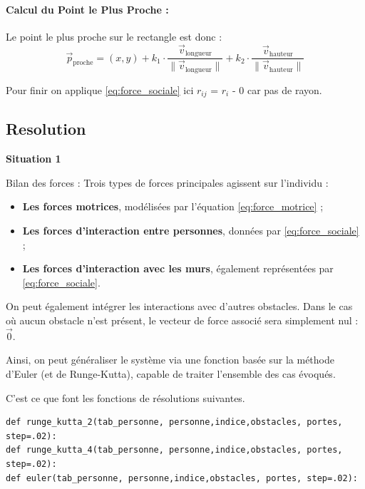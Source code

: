 \documentclass[a4paper,12pt]{article}
\begin{document}
\paragraph{Calcul du Point le Plus Proche :}

Le point le plus proche sur le rectangle est donc :
\[
\vec{p}_{\text{proche}} = (x, y) + k_1 \cdot \frac{\vec{v}_{\text{longueur}}}{\|\vec{v}_{\text{longueur}}\|} + k_2 \cdot \frac{\vec{v}_{\text{hauteur}}}{\|\vec{v}_{\text{hauteur}}\|}
\]

Pour finir on applique \eqref{eq:force_sociale} ici $r_{ij}$ = $r_i$ - 0 car pas de rayon.

\subsection{Resolution}

\textbf{Situation 1}

Bilan des forces :
Trois types de forces principales agissent sur l’individu :
\begin{itemize}
\item \textbf{Les forces motrices}, modélisées par l’équation \eqref{eq:force_motrice} ;
\item \textbf{Les forces d’interaction entre personnes}, données par \eqref{eq:force_sociale} ;
\item \textbf{Les forces d’interaction avec les murs}, également représentées par \eqref{eq:force_sociale}.
\end{itemize}

On peut également intégrer les interactions avec d’autres obstacles. Dans le cas où aucun obstacle n’est présent, le vecteur de force associé sera simplement nul : $\vec{0}$.

\vspace{1em}

Ainsi, on peut généraliser le système via une fonction basée sur la méthode d’Euler (et de Runge-Kutta), capable de traiter l’ensemble des cas évoqués.

\vspace{1em}

C'est ce que font les fonctions de résolutions suivantes.

\begin{verbatim}
def runge_kutta_2(tab_personne, personne,indice,obstacles, portes, step=.02):
def runge_kutta_4(tab_personne, personne,indice,obstacles, portes, step=.02):
def euler(tab_personne, personne,indice,obstacles, portes, step=.02):
\end{verbatim}
\end{document}
